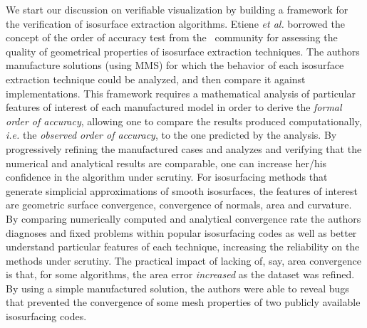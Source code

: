 We start our discussion on verifiable visualization by building a
framework for the verification of isosurface extraction algorithms. 
Etiene \emph{et al.}\cite{etiene:tvcg:2009} 
borrowed the concept of the order of accuracy test from
the \cse~community for assessing the quality of geometrical properties
of isosurface extraction techniques. 
The authors manufacture solutions (using MMS) for which the behavior of each isosurface
extraction technique could be analyzed, and then compare it against
implementations.  This framework requires a mathematical analysis of particular features of
interest of each manufactured model in order to derive
the \emph{formal order of accuracy}, allowing one to compare the
results produced computationally, {\em i.e.} the \emph{observed
order of accuracy}, to the one predicted by the analysis.  By
progressively refining the manufactured cases and analyzes and
verifying that the numerical and analytical results are comparable, one can
increase her/his confidence in the algorithm under scrutiny.
%
For isosurfacing methods that generate
simplicial approximations of smooth isosurfaces, the features of
interest are geometric surface convergence, convergence of normals,
area and curvature.  By comparing numerically computed and analytical
convergence rate the authors  diagnoses and fixed problems within popular
isosurfacing codes as well as better understand particular features of
each technique, increasing the reliability on the methods under
scrutiny. The practical impact of lacking of, say, area convergence is that,
for some algorithms, the area error \emph{increased} as the dataset was refined.
By using a simple manufactured solution, the authors were able to
reveal bugs that prevented the convergence of some mesh properties of
two publicly available isosurfacing codes. 

